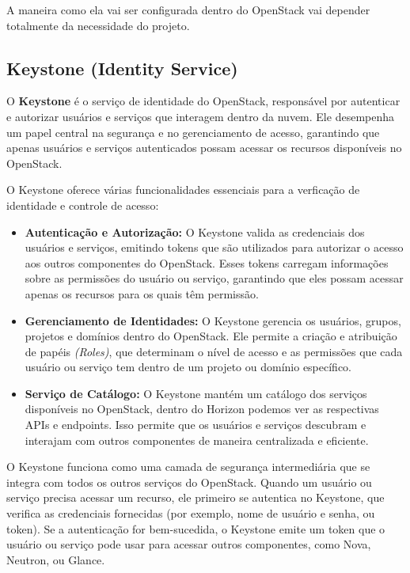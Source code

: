 A maneira como ela vai ser configurada dentro do OpenStack vai depender totalmente da necessidade do projeto.

\subsection{Keystone (Identity Service)}

O \textbf{Keystone} é o serviço de identidade do OpenStack, responsável por autenticar e autorizar usuários e serviços que interagem dentro da nuvem. Ele desempenha um papel central na segurança e no gerenciamento de acesso, garantindo que apenas usuários e serviços autenticados possam acessar os recursos disponíveis no OpenStack.


O Keystone oferece várias funcionalidades essenciais para a verficação de identidade e controle de acesso:

\begin{itemize}
    \item \textbf{Autenticação e Autorização:} O Keystone valida as credenciais dos usuários e serviços, emitindo tokens que são utilizados para autorizar o acesso aos outros componentes do OpenStack. Esses tokens carregam informações sobre as permissões do usuário ou serviço, garantindo que eles possam acessar apenas os recursos para os quais têm permissão.
    \item \textbf{Gerenciamento de Identidades:} O Keystone gerencia os usuários, grupos, projetos e domínios dentro do OpenStack. Ele permite a criação e atribuição de papéis \textit{(Roles)}, que determinam o nível de acesso e as permissões que cada usuário ou serviço tem dentro de um projeto ou domínio específico.
    \item \textbf{Serviço de Catálogo:} O Keystone mantém um catálogo dos serviços disponíveis no OpenStack, dentro do Horizon podemos ver as respectivas APIs e endpoints. Isso permite que os usuários e serviços descubram e interajam com outros componentes de maneira centralizada e eficiente.
\end{itemize}


O Keystone funciona como uma camada de segurança intermediária que se integra com todos os outros serviços do OpenStack. Quando um usuário ou serviço precisa acessar um recurso, ele primeiro se autentica no Keystone, que verifica as credenciais fornecidas (por exemplo, nome de usuário e senha, ou token). Se a autenticação for bem-sucedida, o Keystone emite um token que o usuário ou serviço pode usar para acessar outros componentes, como Nova, Neutron, ou Glance.

